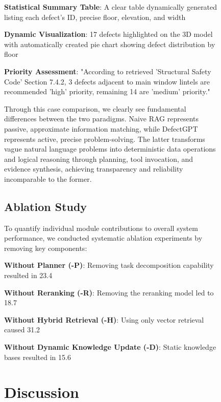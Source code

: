 \begin{figure}[htbp]
\textbf{Statistical Summary Table}: A clear table dynamically generated listing each defect's ID, precise floor, elevation, and width

\textbf{Dynamic Visualization}: 17 defects highlighted on the 3D model with automatically created pie chart showing defect distribution by floor

\textbf{Priority Assessment}: "According to retrieved 'Structural Safety Code' Section 7.4.2, 3 defects adjacent to main window lintels are recommended 'high' priority, remaining 14 are 'medium' priority."

Through this case comparison, we clearly see fundamental differences between the two paradigms. Naive RAG represents passive, approximate information matching, while DefectGPT represents active, precise problem-solving. The latter transforms vague natural language problems into deterministic data operations and logical reasoning through planning, tool invocation, and evidence synthesis, achieving transparency and reliability incomparable to the former.

\subsection{Ablation Study}

To quantify individual module contributions to overall system performance, we conducted systematic ablation experiments by removing key components:

\textbf{Without Planner (-P)}: Removing task decomposition capability resulted in 23.4%

\textbf{Without Reranking (-R)}: Removing the reranking model led to 18.7%

\textbf{Without Hybrid Retrieval (-H)}: Using only vector retrieval caused 31.2%

\textbf{Without Dynamic Knowledge Update (-D)}: Static knowledge bases resulted in 15.6%

\section{Discussion}


\end{figure}

